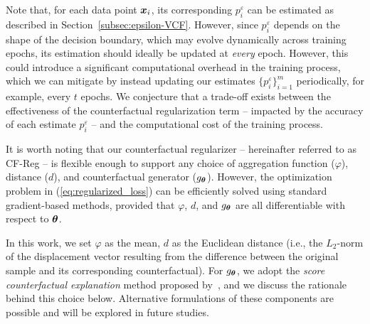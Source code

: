 Note that, for each data point $\boldsymbol{x}_i$, its corresponding $p_i^{\varepsilon}$ can be estimated as described in Section~\ref{subsec:epsilon-VCF}. However, since $p_i^{\varepsilon}$ depends on the shape of the decision boundary, which may evolve dynamically across training epochs, its estimation should ideally be updated at \textit{every} epoch. However, this could introduce a significant computational overhead in the training process, which we can mitigate by instead updating our estimates $\{p_i^{\varepsilon}\}_{i=1}^m$ periodically, for example, every $t$ epochs.
We conjecture that a trade-off exists between the effectiveness of the counterfactual regularization term 
 -- impacted by the accuracy of each estimate $p_i^{\varepsilon}$ -- and the computational cost of the training process.


It is worth noting that our counterfactual regularizer -- hereinafter referred to as CF-Reg -- is flexible enough to support any choice of aggregation function ($\varphi$), distance ($d$), and counterfactual generator ($g_{\boldsymbol{\theta}}$). However, the optimization problem in (\ref{eq:regularized_loss}) can be efficiently solved using standard gradient-based methods, provided that $\varphi$, $d$, and $g_{\boldsymbol{\theta}}$ are all differentiable with respect to $\boldsymbol{\theta}$.

In this work, we set $\varphi$ as the mean, $d$ as the Euclidean distance (i.e., the $L_2$-norm of the displacement vector resulting from the difference between the original sample and its corresponding counterfactual). 
For $g_{\boldsymbol{\theta}}$, we adopt the \textit{score counterfactual explanation} method proposed by~\citet{wachter2017hjlt}, and we discuss the rationale behind this choice below.
Alternative formulations of these components are possible and will be explored in future studies.

